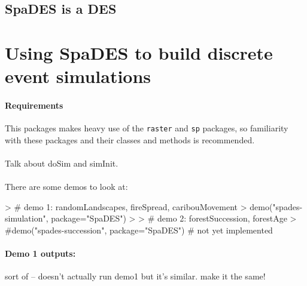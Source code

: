 \documentclass{article}
\begin{document}
\subsection{SpaDES is a DES}

\newpage

\section{Using SpaDES to build discrete event simulations}

\paragraph{Requirements}
This packages makes heavy use of the \texttt{raster} and \texttt{sp} packages, so familiarity with these packages and their classes and methods is recommended.

\paragraph{}
Talk about doSim and simInit.

\paragraph{}
There are some demos to look at:

\begin{Schunk}
\begin{Sinput}
> # demo 1: randomLandscapes, fireSpread, caribouMovement
> demo("spades-simulation", package="SpaDES")
> 
> # demo 2: forestSuccession, forestAge
> #demo("spades-succession", package="SpaDES") # not yet implemented
\end{Sinput}
\end{Schunk}

\paragraph{Demo 1 outputs:}
sort of -- doesn't actually run demo1 but it's similar. make it the same!
\end{document}
